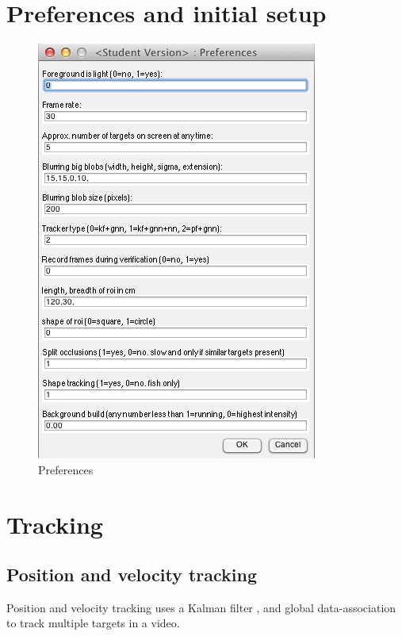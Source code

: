 \documentclass[12pt]{article}
\begin{document}
\section{Preferences and initial setup}
\begin{figure}[h]
\centering
\includegraphics[width=.495\linewidth]{prefs}
\caption{Preferences}
\label{fig:prefs}
\end{figure}

\section{Tracking}

\subsection{Position and velocity tracking}
Position and velocity tracking uses a Kalman filter \cite{BarShalom1987}, and global data-association \cite{Kuhn1955} to track multiple targets in a video. 
\end{document}
